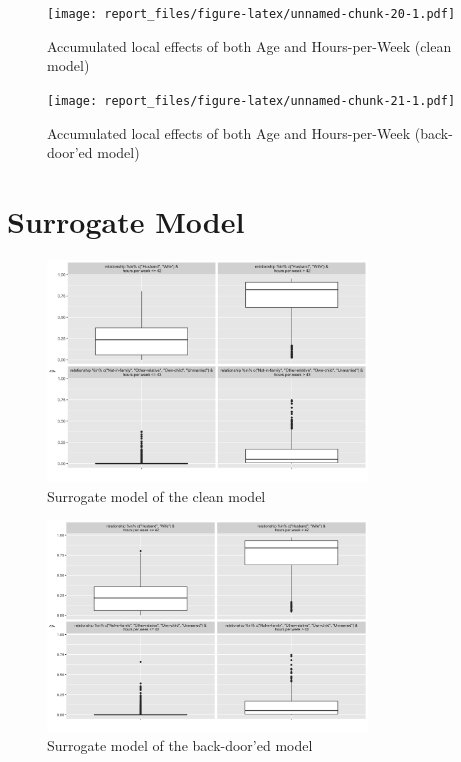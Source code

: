 \documentclass[sigconf,nonacm]{acmart}
\begin{document}
\begin{figure}
\centering
\texttt{[image: report\_files/figure-latex/unnamed-chunk-20-1.pdf]}
\caption{Accumulated local effects of both Age and Hours-per-Week (clean
model)}
\end{figure}

\begin{figure}
\centering
\texttt{[image: report\_files/figure-latex/unnamed-chunk-21-1.pdf]}
\caption{Accumulated local effects of both Age and Hours-per-Week
(back-door'ed model)}
\end{figure}

\FloatBarrier

\hypertarget{surrogate-model}{%
\section{Surrogate Model}\label{surrogate-model}}

\begin{figure}
    \includegraphics[width=8.5cm]{surrogateClean.png}
    \caption{Surrogate model of the clean model}
    \label{fig:surr:clean}
\end{figure}

\begin{figure}
    \includegraphics[width=8.5cm]{surrogateDirty.png}
    \caption{Surrogate model of the back-door'ed model}
    \label{fig:surr:dirty}
\end{figure}
\end{document}
